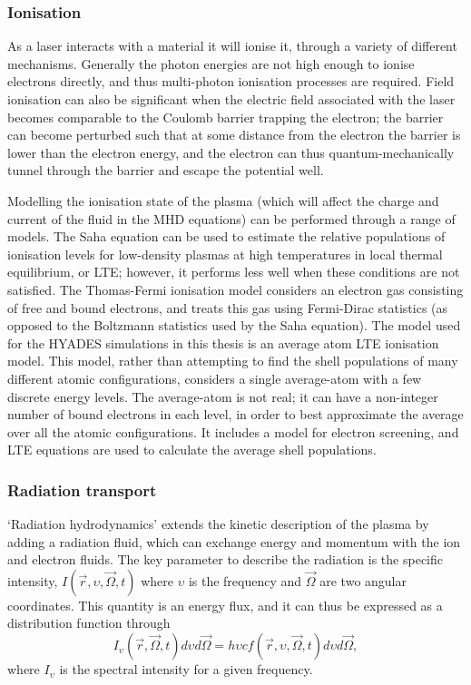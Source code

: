 \subsubsection{Ionisation}
As a laser interacts with a material it will ionise it, through a variety of different mechanisms. Generally the photon energies are not high enough to ionise electrons directly, and thus multi-photon ionisation processes are required. Field ionisation can also be significant when the electric field associated with the laser becomes comparable to the Coulomb barrier trapping the electron; the barrier can become perturbed such that at some distance from the electron the barrier is lower than the electron energy, and the electron can thus quantum-mechanically tunnel through the barrier and escape the potential well.

Modelling the ionisation state of the plasma (which will affect the charge and current of the fluid in the MHD equations) can be performed through a range of models. The Saha equation can be used to estimate the relative populations of ionisation levels for low-density plasmas at high temperatures in local thermal equilibrium, or LTE; however, it performs less well when these conditions are not satisfied. The Thomas-Fermi ionisation model considers an electron gas consisting of free and bound electrons, and treats this gas using Fermi-Dirac statistics (as opposed to the Boltzmann statistics used by the Saha equation). The model used for the HYADES simulations in this thesis is an average atom LTE ionisation model. This model, rather than attempting to find the shell populations of many different atomic configurations, considers a single average-atom with a few discrete energy levels. The average-atom is not real; it can have a non-integer number of bound electrons in each level, in order to best approximate the average over all the atomic configurations. It includes a model for electron screening, and LTE equations are used to calculate the average shell populations. 

\subsubsection{Radiation transport}
`Radiation hydrodynamics' extends the kinetic description of the plasma by adding a radiation fluid, which can exchange energy and momentum with the ion and electron fluids. The key parameter to describe the radiation is the specific intensity, $I(\vec{r}, \upsilon, \vec{\Omega}, t)$ where $\upsilon$ is the frequency and $\vec{\Omega}$ are two angular coordinates. This quantity is an energy flux, and it can thus be expressed as a distribution function through 
\begin{equation} I_{\upsilon}(\vec{r}, \vec{\Omega}, t) d\upsilon d\vec{\Omega} = h \upsilon c f(\vec{r}, \upsilon, \vec{\Omega}, t) d\upsilon d\vec{\Omega}, \end{equation}
where $I_{\upsilon}$ is the spectral intensity for a given frequency.

